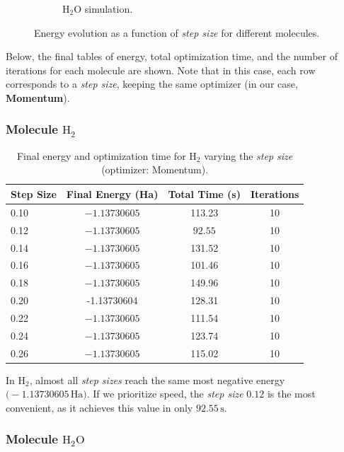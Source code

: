 \begin{figure}[H]
\begin{subfigure}{0.32\textwidth}
    \caption{H$_2$O simulation.}
    \label{fig:step_size_h2o}
  \end{subfigure}
  \caption{Energy evolution as a function of \textit{step size} for different molecules.}
  \label{fig:step_size_results}
\end{figure}

Below, the final tables of energy, total optimization time, and the number of iterations for each molecule are shown. Note that in this case, each row corresponds to a \textit{step size}, keeping the same optimizer (in our case, \textbf{Momentum}).

\subsubsection{Molecule \(\mathrm{H_2}\)}

\begin{table}[H]
\centering
\caption{Final energy and optimization time for \(\mathrm{H_2}\) varying the \textit{step size} (optimizer: Momentum).}
\begin{tabular}{lccc}
\toprule
\textbf{Step Size} & \textbf{Final Energy (Ha)} & \textbf{Total Time (s)} & \textbf{Iterations} \\
\midrule
0.10 & \(\mathbf{-1.13730605}\) & 113.23 & 10 \\
0.12 & \(\mathbf{-1.13730605}\) & \(\mathbf{92.55}\) & 10 \\
0.14 & \(\mathbf{-1.13730605}\) & 131.52 & 10 \\
0.16 & \(\mathbf{-1.13730605}\) & 101.46 & 10 \\
0.18 & \(\mathbf{-1.13730605}\) & 149.96 & 10 \\
0.20 & -1.13730604 & 128.31 & 10 \\
0.22 & \(\mathbf{-1.13730605}\) & 111.54 & 10 \\
0.24 & \(\mathbf{-1.13730605}\) & 123.74 & 10 \\
0.26 & \(\mathbf{-1.13730605}\) & 115.02 & 10 \\
\bottomrule
\end{tabular}
\end{table}

In \(\mathrm{H_2}\), almost all \textit{step sizes} reach the same most negative energy \(\bigl(-1.13730605\,\mathrm{Ha}\bigr)\). If we prioritize speed, the \textit{step size} \(0.12\) is the most convenient, as it achieves this value in only \(92.55\,\mathrm{s}\).

\subsubsection{Molecule \(\mathrm{H_2O}\)}

